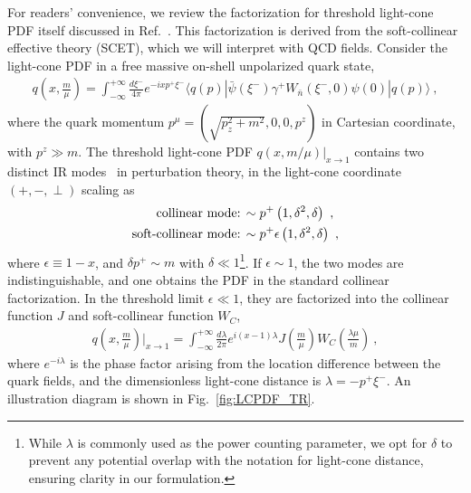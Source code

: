 \documentclass[a4paper,11pt]{article}
\begin{document}
For readers' convenience, we review the factorization for threshold light-cone PDF itself discussed in Ref.~\cite{Becher:2006mr}. This factorization is derived from the soft-collinear effective theory (SCET), which we will interpret with QCD fields. Consider the light-cone PDF in a free massive on-shell unpolarized quark state,
\begin{align}\label{eq:LCpdfq}
    q\left( x, \frac{m}{\mu} \right) = \int_{-\infty}^{+\infty} \frac{d \xi^{-}}{4\pi} e^{- i x p^{+} \xi^{-}} 
    \langle q(p) | \bar{\psi}(\xi^{-}) \gamma^{+} W_{\bar{n}}(\xi^{-},0) \psi(0) | q(p) \rangle \ ,    
\end{align}
where the quark momentum $p^\mu=(\sqrt{p_z^2+m^2},0,0,p^z)$ in Cartesian coordinate, with $p^z \gg m$.  The threshold light-cone PDF $q\left( x, m/\mu\right) |_{x \rightarrow 1}$ contains two distinct IR modes~\cite{Becher:2006mr} in perturbation theory, in the light-cone coordinate $(+,-,\perp)$ scaling as
\begin{align}\label{eq:trpc}
\textit{\rm collinear mode:} \, &\sim p^+ \left(1, \delta^2, \delta \right) \ , \nonumber\\ 
\textit{\rm soft-collinear mode:} \, &\sim p^+ \epsilon \left(1, \delta^2, \delta \right) \ ,
\end{align}
where $\epsilon \equiv 1-x$, and $\delta p^+ \sim m$ with $\delta \ll 1$\footnote{While $\lambda$ is commonly used as the power counting parameter, we opt for $\delta$ to prevent any potential overlap with the notation for light-cone distance, ensuring clarity in our formulation.}. If $\epsilon \sim 1$, the two modes are indistinguishable, and one obtains the PDF in the standard collinear factorization. In the threshold limit $\epsilon \ll 1$, they are factorized into the collinear function $J$ and soft-collinear function $W_C$,
\begin{align}\label{eq:TFLCPDF}
q\left( x, \frac{m}{\mu} \right) \bigg|_{x \rightarrow 1} 
= \int_{-\infty}^{+\infty} \frac{d \lambda}{2\pi} e^{i (x-1) \lambda} 
J\left(\frac{m}{\mu}\right)
W_C\left(\frac{\lambda\mu}{m}\right) \ ,
\end{align}
where $e^{-i \lambda}$ is the phase factor arising from the location difference between the quark fields, and the dimensionless light-cone distance is $\lambda = - p^{+} \xi^{-}$. An illustration diagram is shown in Fig.~\ref{fig:LCPDF_TR}. 
\end{document}
